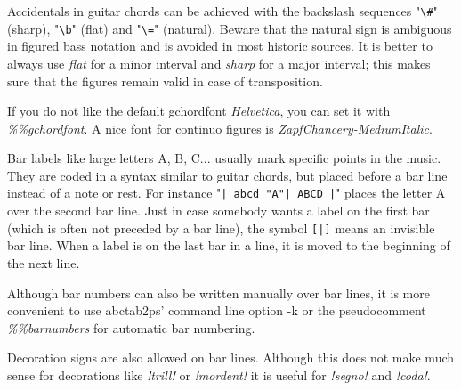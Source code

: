 \documentclass[a4paper]{article}
\begin{document}
  
Accidentals in guitar chords can be achieved with the backslash
sequences "\verb$\#$" (sharp), "\verb$\b$" (flat) and
 "\verb$\=$" (natural). Beware that the natural sign is ambiguous
in figured bass notation and is avoided in most historic sources.
It is better to always use {\it flat} for a minor interval and 
{\it sharp} for a major interval; this makes sure that the
figures remain valid in case of transposition.
\par
If you do not like the default gchordfont {\it Helvetica}, you can 
set it with {\it \%\%gchordfont}. A nice font for continuo figures is
{\it ZapfChancery-MediumItalic}.
\par
{}
Bar labels like large letters A, B, C...
usually mark specific points in the music. They are coded in 
a syntax similar to guitar chords, but placed before
a bar line instead of a note or rest. For instance
"\verb$| abcd "A"| ABCD |$"
places the letter A over the second bar line.
Just in case somebody wants a label on the first bar
(which is often not preceded by a bar line), the 
symbol \verb$[|]$ means an invisible bar line. When a label is on the last
bar in a line, it is moved to the beginning of the next line.
\par
Although bar numbers can also be written manually over bar lines,
it is more convenient to use abctab2ps' command line option
-k or the pseudocomment {\it \%\%barnumbers} for automatic bar numbering.
\par
Decoration signs are also allowed on bar lines. Although this does not
make much sense for decorations like {\it !trill!} or {\it !mordent!} it
is useful for {\it !segno!} and {\it !coda!}.
\end{document}

